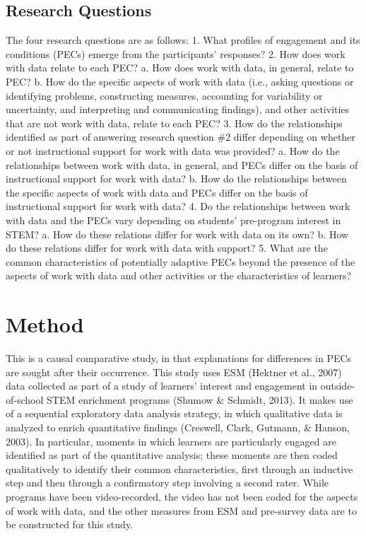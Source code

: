 \documentclass[]{book}
\theoremstyle{definition}
\theoremstyle{definition}
\theoremstyle{definition}
\theoremstyle{remark}
\begin{document}
\section{Research Questions}\label{research-questions}

The four research questions are as follows: 1. What profiles of
engagement and its conditions (PECs) emerge from the participants'
responses? 2. How does work with data relate to each PEC? a. How does
work with data, in general, relate to PEC? b. How do the specific
aspects of work with data (i.e., asking questions or identifying
problems, constructing measures, accounting for variability or
uncertainty, and interpreting and communicating findings), and other
activities that are not work with data, relate to each PEC? 3. How do
the relationships identified as part of answering research question \#2
differ depending on whether or not instructional support for work with
data was provided? a. How do the relationships between work with data,
in general, and PECs differ on the basis of instructional support for
work with data? b. How do the relationships between the specific aspects
of work with data and PECs differ on the basis of instructional support
for work with data? 4. Do the relationships between work with data and
the PECs vary depending on students' pre-program interest in STEM? a.
How do these relations differ for work with data on its own? b. How do
these relations differ for work with data with support? 5. What are the
common characteristics of potentially adaptive PECs beyond the presence
of the aspects of work with data and other activities or the
characteristics of learners?

\chapter{Method}\label{method}

This is a causal comparative study, in that explanations for differences
in PECs are sought after their occurrence. This study uses ESM (Hektner
et al., 2007) data collected as part of a study of learners' interest
and engagement in outside-of-school STEM enrichment programs (Shumow \&
Schmidt, 2013). It makes use of a sequential exploratory data analysis
strategy, in which qualitative data is analyzed to enrich quantitative
findings (Creswell, Clark, Gutmann, \& Hanson, 2003). In particular,
moments in which learners are particularly engaged are identified as
part of the quantitative analysis; these moments are then coded
qualitatively to identify their common characteristics, first through an
inductive step and then through a confirmatory step involving a second
rater. While programs have been video-recorded, the video has not been
coded for the aspects of work with data, and the other measures from ESM
and pre-survey data are to be constructed for this study.
\end{document}
